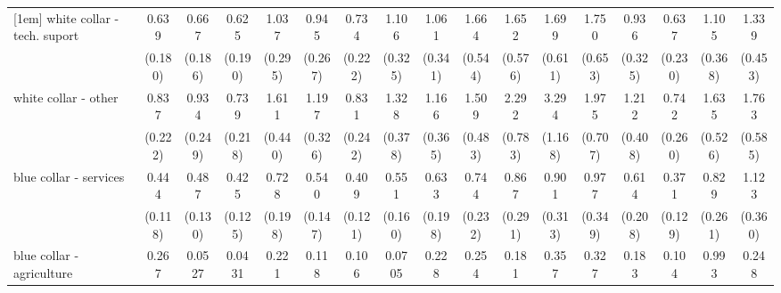 {\begin{tabular}{l*{16}{c}}
[1em]
white collar - tech. suport&       0.639         &       0.667         &       0.625         &       1.037         &       0.945         &       0.734         &       1.106         &       1.061         &       1.664         &       1.652         &       1.699         &       1.750         &       0.936         &       0.637         &       1.105         &       1.339         \\
                    &     (0.180)         &     (0.186)         &     (0.190)         &     (0.295)         &     (0.267)         &     (0.222)         &     (0.325)         &     (0.341)         &     (0.544)         &     (0.576)         &     (0.611)         &     (0.653)         &     (0.325)         &     (0.230)         &     (0.368)         &     (0.453)         \\
[1em]
white collar - other&       0.837         &       0.934         &       0.739         &       1.611         &       1.197         &       0.831         &       1.328         &       1.166         &       1.509         &       2.292\sym{*}  &       3.294\sym{***}&       1.975         &       1.212         &       0.742         &       1.635         &       1.763         \\
                    &     (0.222)         &     (0.249)         &     (0.218)         &     (0.440)         &     (0.326)         &     (0.242)         &     (0.378)         &     (0.365)         &     (0.483)         &     (0.783)         &     (1.168)         &     (0.707)         &     (0.408)         &     (0.260)         &     (0.526)         &     (0.585)         \\
[1em]
blue collar - services&       0.444\sym{**} &       0.487\sym{**} &       0.425\sym{**} &       0.728         &       0.540\sym{*}  &       0.409\sym{**} &       0.551\sym{*}  &       0.633         &       0.744         &       0.867         &       0.901         &       0.977         &       0.614         &       0.371\sym{**} &       0.829         &       1.123         \\
                    &     (0.118)         &     (0.130)         &     (0.125)         &     (0.198)         &     (0.147)         &     (0.121)         &     (0.160)         &     (0.198)         &     (0.232)         &     (0.291)         &     (0.313)         &     (0.349)         &     (0.208)         &     (0.129)         &     (0.261)         &     (0.360)         \\
[1em]
blue collar - agriculture&       0.267         &      0.0527\sym{***}&      0.0431\sym{**} &       0.221         &       0.118\sym{*}  &       0.106\sym{**} &      0.0705\sym{**} &       0.228         &       0.254         &       0.181\sym{*}  &       0.357         &       0.327         &       0.183         &       0.104\sym{**} &       0.993         &       0.248         \\

\end{tabular}}
